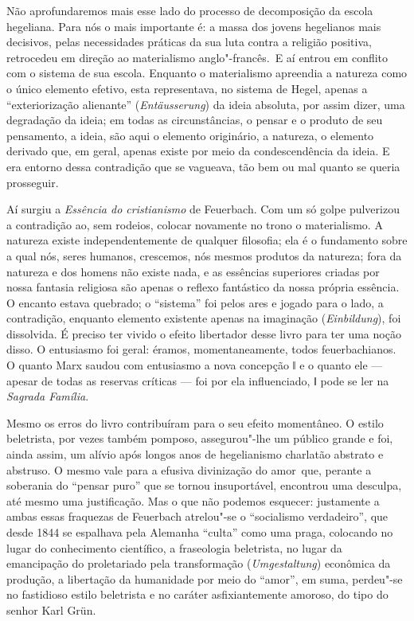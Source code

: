 Não aprofundaremos mais esse lado do processo de decomposição da escola
hegeliana. Para nós o mais importante é: a massa dos jovens hegelianos
mais decisivos, pelas necessidades práticas da sua luta contra a
religião positiva, retrocedeu em direção ao materialismo anglo"-francês.\est\
E aí entrou em conflito com o sistema de sua escola. Enquanto o
materialismo apreendia a natureza como o único elemento efetivo, esta
representava, no sistema
de Hegel,
apenas a ``exteriorização alienante'' (\emph{Entäusserung}) da ideia
absoluta, por assim dizer, uma degradação da ideia; em todas as
circunstâncias, o pensar e o produto de seu pensamento, a ideia, são
aqui o elemento originário, a natureza, o elemento derivado que, em
geral, apenas existe por meio da condescendência da ideia. E era entorno
dessa contradição que se vagueava, tão bem ou mal quanto se queria
prosseguir.

Aí surgiu a \emph{Essência do
cristianismo} de Feuerbach.
Com um só golpe pulverizou a contradição ao, sem rodeios, colocar
novamente no trono o materialismo. A natureza existe independentemente
de qualquer filosofia; ela é o fundamento sobre a qual nós, seres
humanos, crescemos, nós mesmos produtos da natureza; fora da natureza e
dos homens não existe nada, e as essências superiores criadas por nossa
fantasia religiosa são apenas o reflexo fantástico da nossa própria
essência. O encanto estava quebrado; o ``sistema'' foi pelos ares e
jogado para o lado, a contradição, enquanto elemento existente apenas na
imaginação (\emph{Einbildung}), foi dissolvida. É preciso ter vivido o
efeito libertador desse livro para ter uma noção disso. O entusiasmo foi
geral: éramos, momentaneamente, todos feuerbachianos. O quanto Marx
saudou com entusiasmo a nova concepção ǁ e o quanto ele --- apesar de
todas as reservas críticas --- foi por ela influenciado, ǁ pode se ler
na \emph{Sagrada Família}.

Mesmo os erros do livro contribuíram para o seu efeito momentâneo. O
estilo beletrista, por vezes também pomposo, assegurou"-lhe um público
grande e foi, ainda assim, um alívio após longos anos de hegelianismo
charlatão abstrato e abstruso. O mesmo vale para a efusiva divinização
do amor\est\ que, perante a soberania do ``pensar puro'' que se tornou
insuportável, encontrou uma desculpa, até mesmo uma justificação. Mas o
que não podemos esquecer: justamente a ambas essas fraquezas
de Feuerbach
atrelou"-se o ``socialismo verdadeiro'', que desde 1844 se espalhava pela
Alemanha ``culta'' como uma praga, colocando no lugar do conhecimento
científico, a fraseologia beletrista, no lugar da emancipação do
proletariado pela transformação (\emph{Umgestaltung}) econômica da
produção, a libertação da humanidade por meio do ``amor'', em suma,
perdeu"-se no fastidioso estilo beletrista e no caráter asfixiantemente
amoroso, do tipo do
senhor Karl
Grün.

